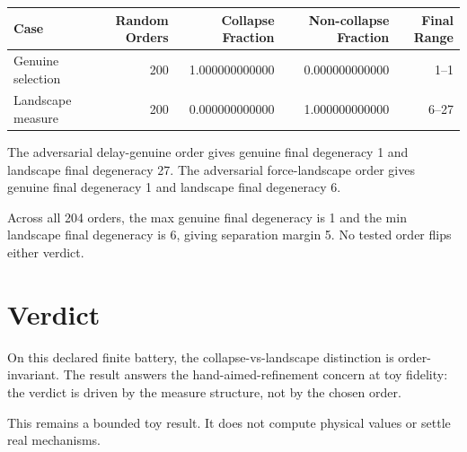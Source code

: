 \documentclass[11pt]{article}
\begin{document}
\begin{center}
\begin{tabular}{lrrrr}
\toprule
Case & Random Orders & Collapse Fraction & Non-collapse Fraction & Final Range \\
\midrule
Genuine selection & 200 & 1.000000000000 & 0.000000000000 & 1--1 \\
Landscape measure & 200 & 0.000000000000 & 1.000000000000 & 6--27 \\
\bottomrule
\end{tabular}
\end{center}

The adversarial delay-genuine order gives genuine final degeneracy 1 and landscape final degeneracy 27. The adversarial force-landscape order gives genuine final degeneracy 1 and landscape final degeneracy 6.

Across all 204 orders, the max genuine final degeneracy is 1 and the min landscape final degeneracy is 6, giving separation margin 5. No tested order flips either verdict.

\section*{Verdict}

On this declared finite battery, the collapse-vs-landscape distinction is order-invariant. The result answers the hand-aimed-refinement concern at toy fidelity: the verdict is driven by the measure structure, not by the chosen order.

This remains a bounded toy result. It does not compute physical values or settle real mechanisms.
\end{document}
